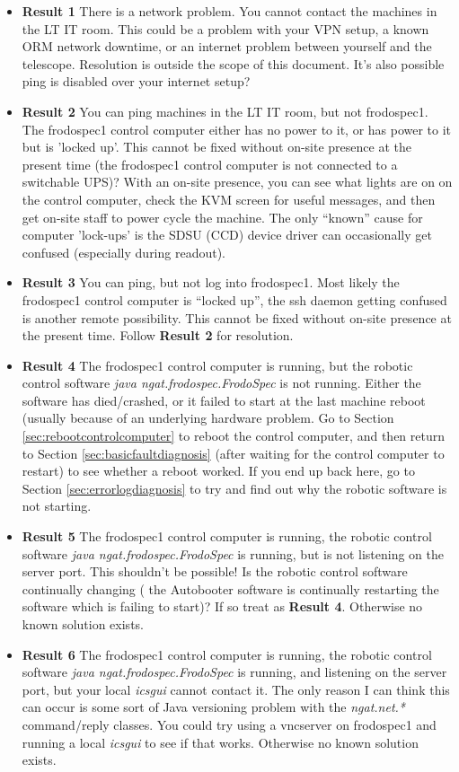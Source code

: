 \documentclass[10pt,a4paper]{article}
\begin{document}
\begin{itemize}
\item {\bf Result 1} There is a network problem. You cannot contact the machines in the LT IT room. This could be
a problem with your VPN setup, a known ORM network downtime, or an internet problem between yourself and the telescope.
Resolution is outside the scope of this document. It's also possible ping is disabled over your internet setup?
\item {\bf Result 2} You can ping machines in the LT IT room, but not frodospec1. The frodospec1 control computer
either has no power to it, or has power to it but is 'locked up'. This cannot be fixed without on-site presence at the present time (the frodospec1 control computer is not connected to a switchable UPS)? With an on-site presence, you can see what lights are on on the control computer, check the KVM screen for useful messages, and then get on-site staff to power cycle the machine. The only ``known'' cause for computer 'lock-ups' is the SDSU (CCD) device driver can occasionally
get confused (especially during readout).
\item {\bf Result 3} You can ping, but not log into frodospec1. Most likely the frodospec1 control computer is ``locked up'', the ssh daemon getting confused is another remote possibility. This cannot be fixed without on-site presence at the present time. Follow {\bf Result 2} for resolution.
\item {\bf Result 4} The frodospec1 control computer is running, but the robotic control software {\em java ngat.frodospec.FrodoSpec} is not running. Either the software has died/crashed, or it failed to start at the last machine reboot (usually because of an underlying hardware problem.  Go to Section \ref{sec:rebootcontrolcomputer} to reboot the control
computer, and then return to Section \ref{sec:basicfaultdiagnosis} (after waiting for the control computer to restart) to see whether a reboot worked. If you end up back here, go to Section \ref{sec:errorlogdiagnosis} to try and find out why the robotic software is not starting.
\item {\bf Result 5} The frodospec1 control computer is running, the robotic control software {\em java ngat.frodospec.FrodoSpec} is running, but is not listening on the server port. This shouldn't be possible! Is the robotic control software continually changing ( the Autobooter software is continually restarting the software which is failing to start)? If so treat as {\bf Result 4}. Otherwise no known solution exists.
\item {\bf Result 6} The frodospec1 control computer is running, the robotic control software {\em java ngat.frodospec.FrodoSpec} is running, and listening on the server port, but your local {\em icsgui} cannot contact it. The only reason I can think this can occur is some sort of Java versioning problem with the {\em ngat.net.*} command/reply classes. You could try using a vncserver on frodospec1 and running a local {\em icsgui} to see if that works. Otherwise no known solution exists.
\end{itemize}
\end{document}
